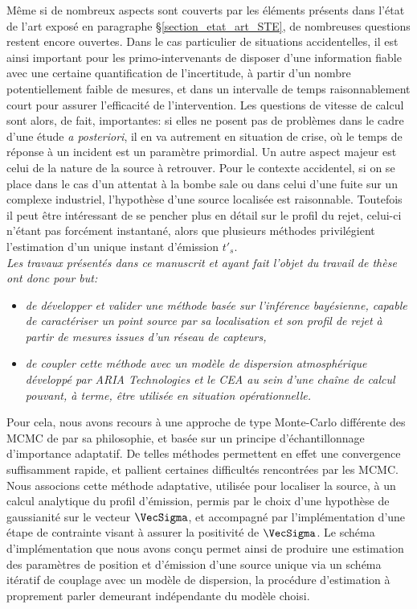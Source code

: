  Même si de nombreux aspects sont couverts par les éléments présents dans l'état de l'art exposé en paragraphe §\ref{section_etat_art_STE}, de nombreuses questions restent encore ouvertes. Dans le cas particulier de situations accidentelles, il est ainsi important pour les primo-intervenants de disposer d'une information fiable avec une certaine quantification de l'incertitude, à partir d'un nombre potentiellement faible de mesures, et dans un intervalle de temps raisonnablement court pour assurer l'efficacité de l'intervention. Les questions de vitesse de calcul sont alors, de fait, importantes: si elles ne posent pas de problèmes dans le cadre d'une étude \textit{a posteriori}, il en va autrement en situation de crise, où le temps de réponse à un incident est un paramètre primordial. Un autre aspect majeur est celui de la nature de la source à retrouver. Pour le contexte accidentel, si on se place dans le cas d'un attentat à la bombe sale ou dans celui d'une fuite sur un complexe industriel, l'hypothèse d'une source localisée est raisonnable. Toutefois il peut être intéressant de se pencher plus en détail sur le profil du rejet, celui-ci n'étant pas forcément instantané, alors que plusieurs méthodes privilégient l'estimation d'un unique instant d'émission $t'_s$. \\
 

\textit{Les travaux présentés dans ce manuscrit et ayant fait l'objet du travail de thèse ont donc pour but: }
 	
 	\begin{itemize}
 		\item \textit{de développer et valider une méthode basée sur l'inférence bayésienne, capable de caractériser un point source par sa localisation et son profil de rejet à partir de mesures issues d'un réseau de capteurs, }
 		\item \textit{de coupler cette méthode avec un modèle de dispersion atmosphérique développé par ARIA Technologies et le CEA au sein d'une chaîne de calcul pouvant, à terme, être utilisée en situation opérationnelle.} \\
 	\end{itemize}

 
 Pour cela, nous avons recours à une approche de type Monte-Carlo différente des MCMC de par sa philosophie, et basée sur un principe d'échantillonnage d'importance adaptatif. De telles méthodes permettent en effet une convergence suffisamment rapide, et pallient certaines difficultés rencontrées par les MCMC. Nous associons cette méthode adaptative, utilisée pour localiser la source, à un calcul analytique du profil d'émission, permis par le choix d'une hypothèse de gaussianité sur le vecteur $\VecSigma$, et accompagné par l'implémentation d'une étape de contrainte visant à assurer la positivité de $\VecSigma$. Le schéma d'implémentation que nous avons conçu permet ainsi de produire une estimation des paramètres de position et d'émission d'une source unique via un schéma itératif de couplage avec un modèle de dispersion, la procédure d'estimation à proprement parler demeurant indépendante du modèle choisi. \\
 

